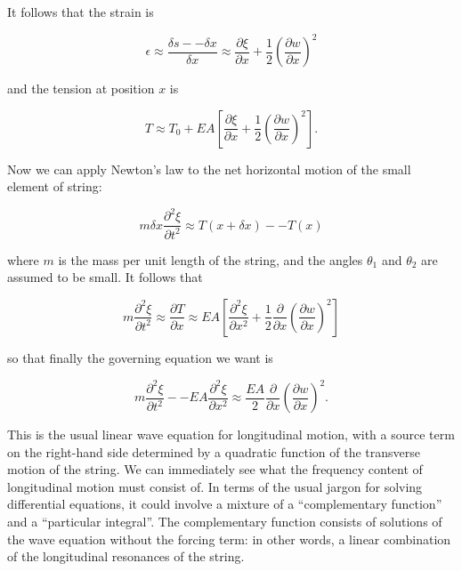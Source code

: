   It follows that the strain is 

  \begin{equation*}\epsilon \approx \dfrac{\delta s -- \delta x}{\delta x} 
  \approx \dfrac{\partial \xi}{\partial x} + \dfrac{1}{2}\left(\dfrac{\partial 
  w}{\partial x}\right)^2 \tag{5}\end{equation*} 

  \noindent{}and the tension at position $x$ is 

  \begin{equation*}T \approx T_0 + EA\left[\dfrac{\partial \xi}{\partial x} + 
  \dfrac{1}{2}\left(\dfrac{\partial w}{\partial x}\right)^2 \right] . 
  \tag{6}\end{equation*} 

  Now we can apply Newton's law to the net horizontal motion of the small 
  element of string: 

  \begin{equation*}m \delta x \dfrac{\partial^2 \xi}{\partial t^2} \approx 
  T(x+\delta x) -- T(x) \tag{7}\end{equation*} 

  \noindent{}where $m$ is the mass per unit length of the string, and the 
  angles $\theta_1$ and $\theta_2$ are assumed to be small. It follows that 

  \begin{equation*}m \dfrac{\partial^2 \xi}{\partial t^2} \approx 
  \dfrac{\partial T}{\partial x} \approx EA\left[ \dfrac{\partial^2 
  \xi}{\partial x^2} + \dfrac{1}{2} \dfrac{\partial}{\partial x} 
  \left(\dfrac{\partial w}{\partial x}\right)^2 \right] \tag{8}\end{equation*} 

  \noindent{}so that finally the governing equation we want is 

  \begin{equation*}m \dfrac{\partial^2 \xi}{\partial t^2} -- EA 
  \dfrac{\partial^2 \xi}{\partial x^2} \approx \dfrac{EA}{2} 
  \dfrac{\partial}{\partial x} \left(\dfrac{\partial w}{\partial x}\right)^2 . 
  \tag{9}\end{equation*} 

  This is the usual linear wave equation for longitudinal motion, with a source 
  term on the right-hand side determined by a quadratic function of the 
  transverse motion of the string. We can immediately see what the frequency 
  content of longitudinal motion must consist of. In terms of the usual jargon 
  for solving differential equations, it could involve a mixture of a 
  ``complementary function'' and a ``particular integral''. The complementary 
  function consists of solutions of the wave equation without the forcing term: 
  in other words, a linear combination of the longitudinal resonances of the 
  string. 

